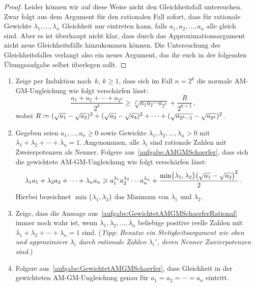 \begin{proof}
	Leider können wir auf diese Weise nicht den Gleichheitsfall untersuchen. Zwar folgt aus dem Argument für den rationalen Fall sofort, dass für rationale Gewichte $\lambda_1,\dotsc,\lambda_n$ Gleichheit nur eintreten kann, falls $a_1,a_2,\dotsc,a_n$ alle gleich sind. Aber es ist überhaupt nicht klar, dass durch das Approximationsargument nicht neue Gleichheitsfälle hinzukommen können. Die Untersuchung des Gleichheitsfalles verlangt also ein neues Argument, das ihr euch in der folgenden Übungsaufgabe selbst überlegen sollt.
\end{proof}
\begin{aufgabe*}\leavevmode
	\begin{enumerate}[label={$(\alph*)$},ref={$(\alph*)$}]
		\item Zeige per Induktion nach~$k$, $k\geqslant 1$, dass sich im Fall $n=2^k$ die normale AM-GM-Ungleichung wie folgt verschärfen lässt:
		\begin{equation*}
			\frac{a_1+a_2+\dotsb+a_{2^k}}{2^k}\geqslant \sqrt[2^k]{a_1a_2\dotsm a_{2^k}}+\frac{R}{2^{k+1}}\,,
		\end{equation*}
		wobei $R\coloneqq \lparen\sqrt{a_1}-\sqrt{a_2}\rparen^2+\lparen\sqrt{a_3}-\sqrt{a_4}\rparen^2+\dotsb+\lparen\sqrt{a_{2^k-1}}-\sqrt{a_{2^k}}\rparen^2$.\label{aufgabe:AMGMSchaerfer}
		\item Gegeben seien $a_1,\dotsc,a_n\geqslant 0$ sowie Gewichte $\lambda_1,\lambda_2,\dotsc,\lambda_n>0$ mit $\lambda_1+\lambda_2+\dotsb+\lambda_n=1$. Angenommen, alle $\lambda_i$ sind rationale Zahlen mit Zweierpotenzen als Nenner. Folgere aus~\ref{aufgabe:AMGMSchaerfer}, dass sich die gewichtete AM-GM-Ungleichung wie folgt verschärfen lässt:\label{aufgabe:GewichtetAMGMSchaerferRational}
		\begin{equation*}
			\lambda_1 a_1+\lambda_2 a_2+\dotsb+\lambda_na_n\geqslant a_1^{\lambda_1}a_2^{\lambda_2}\dotsm a_n^{\lambda_n}+\frac{\min\{\lambda_1,\lambda_2\}\parens*{\sqrt{a_1}-\sqrt{a_2}}^2}{2}\,.
		\end{equation*}
		Hierbei bezeichnet $\min\{\lambda_1,\lambda_2\}$ das Minimum von $\lambda_1$ und $\lambda_2$.
		\item Zeige, dass die Aussage aus~\ref{aufgabe:GewichtetAMGMSchaerferRational} immer noch wahr ist, wenn $\lambda_1,\lambda_2,\dotsc,\lambda_n$ beliebige positive reelle Zahlen mit $\lambda_1+\lambda_2+\dotsb+\lambda_n=1$ sind. (\emph{Tipp: Benutze ein Stetigkeitsargument wie oben und approximiere $\lambda_i$ durch rationale Zahlen $\lambda_i'$, deren Nenner Zweierpotenzen sind.})\label{aufgabe:GewichtetAMGMSchaerfer}
		\item Folgere aus~\ref{aufgabe:GewichtetAMGMSchaerfer}, dass Gleichheit in der gewichteten AM-GM-Ungleichung genau für $a_1=a_2=\dotsb=a_n$ eintritt.
	\end{enumerate}
\end{aufgabe*}

